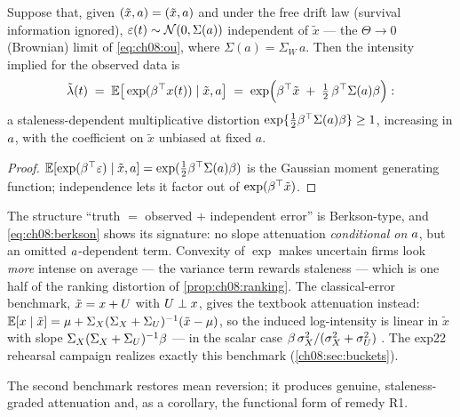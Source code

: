 \begin{proposition}\label{prop:ch08:berkson}
Suppose that, given $(\tilde{x}, a) = (\tilde x, a)$ and under
the free drift law (survival information ignored), $\varepsilon(t) \sim
\mathcal{N}(0, \Sigma(a))$ independent of $\tilde x$ --- the
$\Theta \to 0$ (Brownian) limit of \cref{eq:ch08:ou}, where $\Sigma(a) =
\Sigma_W\, a$. Then the intensity implied for the observed data is
\begin{equation}\label{eq:ch08:berkson}
\tilde{\lambda}(t)
 \;=\;
 \mathbb{E}\big[\exp(\beta^{\top}x(t)) \mid \tilde x, a\big]
 \;=\;
 \exp\!\Big(\beta^{\top}\tilde x \;+\; \tfrac12\,\beta^{\top}\Sigma(a)\beta\Big):
\end{equation}
a staleness-dependent multiplicative distortion
$\exp\{\tfrac12\beta^{\top}\Sigma(a)\beta\} \ge 1$, increasing in
$a$, with the coefficient on $\tilde x$ unbiased at fixed $a$.
\end{proposition}

\begin{proof}
$\mathbb{E}[\exp(\beta^{\top}\varepsilon) \mid \tilde x, a] =
\exp(\tfrac12\beta^{\top}\Sigma(a)\beta)$ is the Gaussian moment generating
function; independence lets it factor out of
$\exp(\beta^{\top}\tilde x)$.
\end{proof}

\begin{remark}
The structure ``truth $=$ observed $+$ independent error'' is
Berkson-type, and \cref{eq:ch08:berkson} shows its signature: no slope
attenuation \emph{conditional on} $a$, but an omitted
$a$-dependent term. Convexity of $\exp$ makes uncertain firms
look \emph{more} intense on average --- the variance term rewards
staleness --- which is one half of the ranking distortion of
\cref{prop:ch08:ranking}. The classical-error benchmark, $\tilde x =
x + U$ with $U \perp x$, gives the textbook attenuation instead:
$\mathbb{E}[x \mid \tilde x] = \mu + \Sigma_X(\Sigma_X + \Sigma_U)^{-1}(\tilde
x - \mu)$, so the induced log-intensity is linear in $\tilde x$ with
slope $\Sigma_X(\Sigma_X+\Sigma_U)^{-1}\beta$ --- in the scalar case
$\beta\,\sigma_X^2/(\sigma_X^2+\sigma_U^2)$
\citep{prentice1982,carroll2006}. The exp22 rehearsal campaign realizes
exactly this benchmark (\cref{ch08:sec:buckets}).
\end{remark}

The second benchmark restores mean reversion; it produces genuine,
staleness-graded attenuation and, as a corollary, the functional form of
remedy R1.

